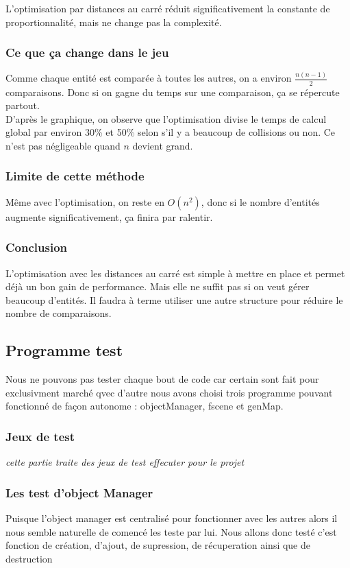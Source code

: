 \documentclass[a4paper,11pt]{article}
\begin{document}
L’optimisation par distances au carré réduit significativement la constante de proportionnalité, mais ne change pas la complexité.

\subsubsection{Ce que ça change dans le jeu}

Comme chaque entité est comparée à toutes les autres, on a environ \(\frac{n(n-1)}{2}\) comparaisons. Donc si on gagne du temps sur une comparaison, ça se répercute partout. \\

D’après le graphique, on observe que l’optimisation divise le temps de calcul global par environ 30\% et 50\% selon s’il y a beaucoup de collisions ou non. Ce n’est pas négligeable quand $n$ devient grand.

\subsubsection{Limite de cette méthode}
Même avec l’optimisation, on reste en $O(n^2)$, donc si le nombre d’entités augmente significativement, ça finira par ralentir.
\subsubsection{Conclusion}
L’optimisation avec les distances au carré est simple à mettre en place et permet déjà un bon gain de performance. Mais elle ne suffit pas si on veut gérer beaucoup d’entités. Il faudra à terme utiliser une autre structure pour réduire le nombre de comparaisons.

\newpage


\subsection{Programme test}
Nous ne pouvons pas tester chaque bout de code car certain sont fait pour exclusivment marché qvec d'autre nous avons choisi trois programme pouvant fonctionné de façon autonome : objectManager, fscene et genMap.

\subsubsection{Jeux de test}
\textit{cette partie traite des jeux de test effecuter pour le projet}

\subsubsection{Les test d'object Manager}
Puisque l'object manager est centralisé pour fonctionner avec les autres alors il nous semble naturelle de comencé les teste par lui.
Nous allons donc testé c'est fonction de création, d'ajout, de supression, de récuperation ainsi que de destruction\\
\end{document}
